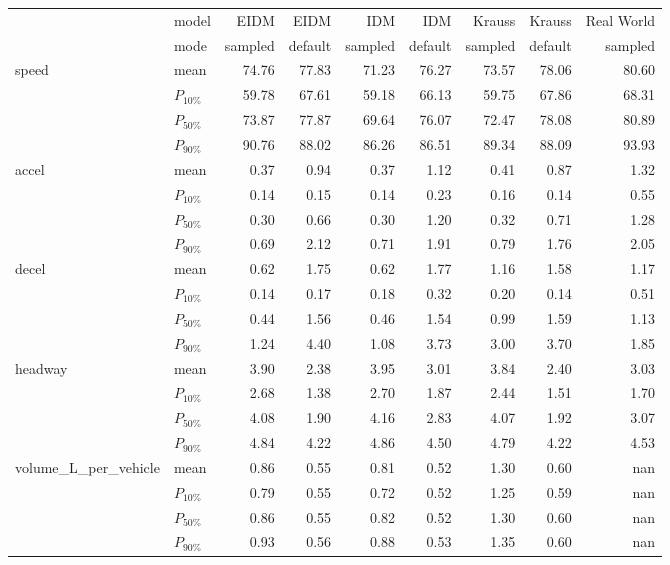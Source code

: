 \begin{tabular}{llrrrrrrr}
 & model & EIDM & EIDM  & IDM & IDM  & Krauss & Krauss  & Real World \\
 & mode & sampled &  default & sampled &  default & sampled &  default & sampled \\
\multirow[c]{4}{*}{speed} & mean & 74.76 & 77.83 & 71.23 & 76.27 & 73.57 & 78.06 & 80.60 \\
 & $P_{10\%}$ & 59.78 & 67.61 & 59.18 & 66.13 & 59.75 & 67.86 & 68.31 \\
 & $P_{50\%}$ & 73.87 & 77.87 & 69.64 & 76.07 & 72.47 & 78.08 & 80.89 \\
 & $P_{90\%}$ & 90.76 & 88.02 & 86.26 & 86.51 & 89.34 & 88.09 & 93.93 \\
\multirow[c]{4}{*}{accel} & mean & 0.37 & 0.94 & 0.37 & 1.12 & 0.41 & 0.87 & 1.32 \\
 & $P_{10\%}$ & 0.14 & 0.15 & 0.14 & 0.23 & 0.16 & 0.14 & 0.55 \\
 & $P_{50\%}$ & 0.30 & 0.66 & 0.30 & 1.20 & 0.32 & 0.71 & 1.28 \\
 & $P_{90\%}$ & 0.69 & 2.12 & 0.71 & 1.91 & 0.79 & 1.76 & 2.05 \\
\multirow[c]{4}{*}{decel} & mean & 0.62 & 1.75 & 0.62 & 1.77 & 1.16 & 1.58 & 1.17 \\
 & $P_{10\%}$ & 0.14 & 0.17 & 0.18 & 0.32 & 0.20 & 0.14 & 0.51 \\
 & $P_{50\%}$ & 0.44 & 1.56 & 0.46 & 1.54 & 0.99 & 1.59 & 1.13 \\
 & $P_{90\%}$ & 1.24 & 4.40 & 1.08 & 3.73 & 3.00 & 3.70 & 1.85 \\
\multirow[c]{4}{*}{headway} & mean & 3.90 & 2.38 & 3.95 & 3.01 & 3.84 & 2.40 & 3.03 \\
 & $P_{10\%}$ & 2.68 & 1.38 & 2.70 & 1.87 & 2.44 & 1.51 & 1.70 \\
 & $P_{50\%}$ & 4.08 & 1.90 & 4.16 & 2.83 & 4.07 & 1.92 & 3.07 \\
 & $P_{90\%}$ & 4.84 & 4.22 & 4.86 & 4.50 & 4.79 & 4.22 & 4.53 \\
\multirow[c]{4}{*}{volume_L_per_vehicle} & mean & 0.86 & 0.55 & 0.81 & 0.52 & 1.30 & 0.60 & nan \\
 & $P_{10\%}$ & 0.79 & 0.55 & 0.72 & 0.52 & 1.25 & 0.59 & nan \\
 & $P_{50\%}$ & 0.86 & 0.55 & 0.82 & 0.52 & 1.30 & 0.60 & nan \\
 & $P_{90\%}$ & 0.93 & 0.56 & 0.88 & 0.53 & 1.35 & 0.60 & nan \\
\end{tabular}
